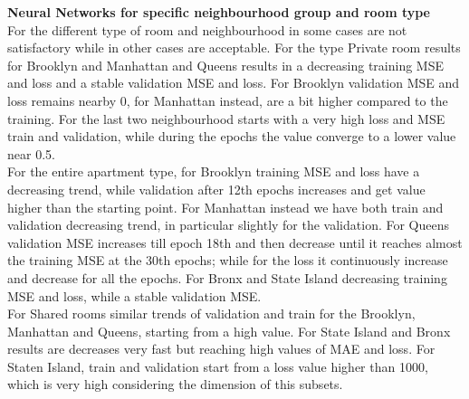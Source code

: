 \documentclass{FR16}
\begin{document}
\newpage 
\noindent \textbf{Neural Networks  for specific neighbourhood group and room type}\\
For the different type of room and neighbourhood in some cases are not satisfactory while in other cases are acceptable. For the type Private room results for Brooklyn and Manhattan and Queens results in a decreasing training MSE and loss and a stable validation MSE and loss. For Brooklyn validation MSE and loss remains nearby 0, for Manhattan instead, are a bit higher compared to the training. For the last two neighbourhood starts with a very high loss and MSE train and validation, while during the epochs the value converge to a lower value near 0.5.
\\ For the entire apartment type, for Brooklyn training MSE and loss have a decreasing trend, while validation after 12th epochs increases and get value higher than the starting point. 
For Manhattan instead we have both train and validation decreasing trend, in particular slightly for the validation. For Queens validation MSE increases till epoch 18th and then decrease until it reaches almost the training MSE at the 30th epochs; while for the loss it continuously increase and decrease for all the epochs. For Bronx and State Island decreasing training MSE and loss, while a stable validation MSE.  \\ For Shared rooms similar trends of validation and train for the Brooklyn, Manhattan and Queens, starting from a high value. For State Island and Bronx results are decreases very fast but reaching high values of MAE and loss. For Staten Island, train and validation start from a loss value higher than 1000, which is very high considering the dimension of this subsets.  
\end{document}
